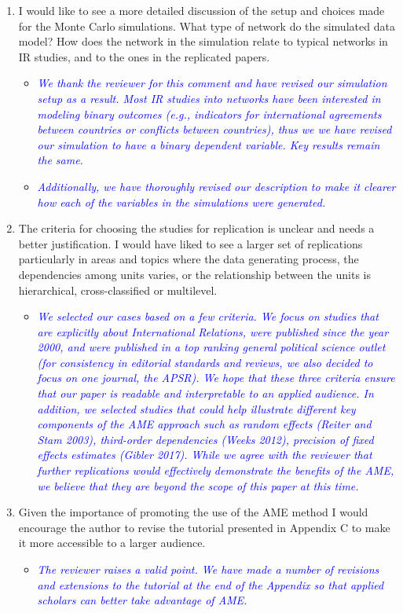 \begin{enumerate}
\begin{itemize}
{{		}}
	\end{itemize}
	\item I would like to see a more detailed discussion of the setup and choices made for the Monte Carlo simulations. What type of network do the simulated data model? How does the network in the simulation relate to typical networks in IR studies, and to the ones in the replicated papers.
	\begin{itemize}
		\item \textcolor{blue}{ \emph{
		We thank the reviewer for this comment and have revised our simulation setup as a result. Most IR studies into networks have been interested in modeling binary outcomes (e.g., indicators for international agreements between countries or conflicts between countries), thus we we have revised our simulation to have a binary dependent variable. Key results remain the same.
		}}
		\item \textcolor{blue}{ \emph{
		Additionally, we have thoroughly revised our description to make it clearer how each of the variables in the simulations were generated.
		}}
	\end{itemize}
	\item The criteria for choosing the studies for replication is unclear and needs a better justification. I would have liked to see a larger set of replications particularly in areas and topics where the data generating process, the dependencies among units varies, or the relationship between the units is hierarchical, cross-classified or multilevel.
	\begin{itemize}
		\item \textcolor{blue}{ \emph{
		We selected our cases based on a few criteria. We focus on studies that are explicitly about International Relations, were published since the year 2000, and were published in a top ranking general political science outlet (for consistency in editorial standards and reviews, we also decided to focus on one journal, the APSR). We hope that these three criteria ensure that our paper is readable and interpretable to an applied audience. In addition, we selected studies that could help illustrate different key components of the AME approach such as random effects (Reiter and Stam 2003), third-order dependencies (Weeks 2012), precision of fixed effects estimates (Gibler 2017).  While we agree with the reviewer that further replications would effectively demonstrate the benefits of the AME, we believe that they are beyond the scope of this paper at this time.
		}}
	\end{itemize}
	\item Given the importance of promoting the use of the AME method I would encourage the author to revise the tutorial presented in Appendix C to make it more accessible to a larger audience.
	\begin{itemize}
		\item \textcolor{blue}{ \emph{
		The reviewer raises a valid point. We have made a number of revisions and extensions to the tutorial at the end of the Appendix so that applied scholars can better take advantage of AME.
		}}
	\end{itemize}
\end{enumerate}
